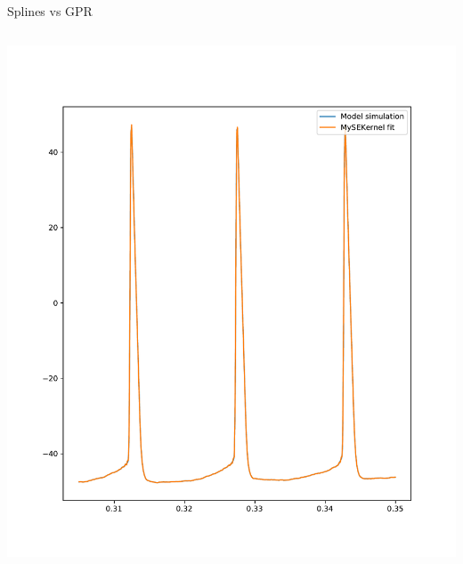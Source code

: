 \documentclass[presentation]{beamer}
\begin{document}
\begin{frame}[plain,label={sec:org57a8d4d}]{Splines vs GPR}
\begin{columns}
\begin{column}{0.5\columnwidth}
\begin{center}
\includegraphics[width=1.1\textwidth]{./SEKernel_f_6d23e2_l_5d71e-8_n_0d1.pdf}
\end{center}
\end{column}
\end{columns}
\end{frame}
\end{document}
